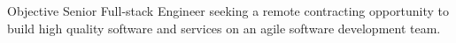 \begin{section}{Objective}
  Senior Full-stack Engineer seeking a remote contracting opportunity to build high quality software and services on an agile software development team.
\end{section}
